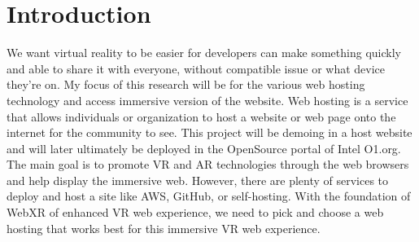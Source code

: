 \section{Introduction}
We want virtual reality to be easier for developers can make something quickly and able to share it with everyone, without compatible issue or what device they're on. My focus of this research will be for the various web hosting technology and access immersive version of the website. Web hosting is a service that allows individuals or organization to host a website or web page onto the internet for the community to see. This project will be demoing in a host website and will later ultimately be deployed in the OpenSource portal of Intel O1.org. The main goal is to promote VR and AR technologies through the web browsers and help display the immersive web. However, there are plenty of services to deploy and host a site like AWS, GitHub, or self-hosting. With the foundation of WebXR of enhanced VR web experience, we need to pick and choose a web hosting that works best for this immersive VR web experience.  

